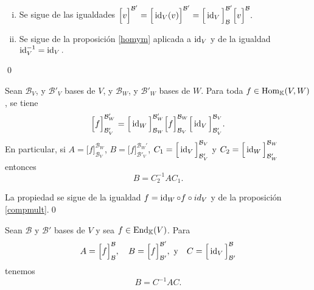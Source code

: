 \dem \begin{enumerate}[(i)]
\item Se sigue de las igualdades $\Big[v\Big]^{\mathcal{B}'}=\Big[\operatorname{id}_V(v)\Big]^{\mathcal{B}'}=\Big[\operatorname{id}_V\Big]^{\mathcal{B}'}_\mathcal{B}\Big[v\Big]^{\mathcal{B}}.$ 
\item Se sigue de la proposici\'on \ref{homym} aplicada a $\operatorname{id}_V$ y de la igualdad $\operatorname{id}_V^{-1}=\operatorname{id}_V.$
\end{enumerate}
\qed

\begin{prop}
Sean $\mathcal{B}_V$, y $\mathcal{B}'_V$ bases de $V$, y $\mathcal{B}_W$, y $\mathcal{B}'_W$ bases de $W$. Para toda $f\in\operatorname{Hom}_{\mathbb{K}}(V,W)$, se tiene
\[
\Big[ f\Big]^{\mathcal{B}_W'}_{\mathcal{B}'_V}=\Big[\operatorname{id}_W\Big]^{\mathcal{B}'_W}_{\mathcal{B}_W}\Big[ f\Big]^{\mathcal{B}_W}_{\mathcal{B}_V}\Big[\operatorname{id}_V\Big]^{\mathcal{B}_V}_{\mathcal{B}'_V}.
\]
En particular, si $A=\Big[ f\Big]^{\mathcal{B}_W}_{\mathcal{B}_V}$, $B=\Big[ f\Big]^{\mathcal{B}_W'}_{\mathcal{B}'_V}$, $C_1=\Big[\operatorname{id}_V\Big]^{\mathcal{B}_V}_{\mathcal{B}'_V}$ y $C_2=\Big[\operatorname{id}_W\Big]^{\mathcal{B}_W}_{\mathcal{B}'_W}$ entonces
$$B=C_2^{-1}AC_1.$$
\end{prop}

\dem La propiedad se sigue de la igualdad $f=\operatorname{id}_W\circ f\circ id_V$ y de la proposici\'on \ref{compmult}.\qed

\begin{obs}
Sean $\mathcal{B}$ y $\mathcal{B}'$ bases de $V$ y sea $f\in\operatorname{End}_{\mathbb{K}}(V)$. Para
\[
A=\Big[ f\Big]^{\mathcal{B}}_{\mathcal{B}},\quad B=\Big[ f\Big]^{\mathcal{B}'}_{\mathcal{B}'},\textrm{ y}\quad C=\Big[\operatorname{id}_V\Big]^{\mathcal{B}}_{\mathcal{B}'}
\]
tenemos
\[
B=C^{-1}AC.
\]
\end{obs}

